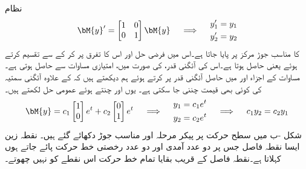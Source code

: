 نظام 
\begin{gather}\label{مساوات_نظام_مناسب_جوڑ}
\begin{aligned}
\bM{y}'=\begin{bmatrix} 1 & 0 \\ 0 &1 \end{bmatrix} \bM{y}
\end{aligned}\quad \implies \quad 
\begin{aligned} 
y_1'&=y_1\\
y_2'&=y_2
\end{aligned}
\end{gather}
کا مناسب جوڑ مرکز پر پایا جاتا ہے۔اس میں فرضی حل  اور اس کا تفرق  پر کر کے  سے تقسیم کرتے ہوئے   یعنی  حاصل ہوتا ہے۔اس کی آئگنی قدر،  کی صورت میں، امتیازی مساوات  سے    حاصل ہوتی ہے۔مساوات  کے اجزاء   اور  میں حاصل آئگنی قدر پر کرتے ہوئے ہم دیکھتے ہیں کہ  کے علاوہ آئگنی سمتیہ  کی کوئی بھی قیمت چننی جا سکتی ہے۔ یوں  اور  چنتے ہوئے عمومی حل لکھتے ہیں۔
\begin{gather*}
\begin{aligned}
\bM{y}=c_1\begin{bmatrix}1 \\ 0  \end{bmatrix} e^{t} +c_2\begin{bmatrix} 0 \\ 1 \end{bmatrix} e^{t}
\end{aligned}\quad \implies \quad
\begin{aligned}
y_1&=c_1e^t\\
y_2&=c_2e^t
\end{aligned} \quad \implies \quad
\begin{aligned}
c_1y_2=c_2y_1
\end{aligned}
\end{gather*} 
شکل -ب میں سطح حرکت پر پیکر مرحلہ اور مناسب جوڑ دکھائے گئے ہیں۔ 
\quad نقطہ زین\\
ایسا نقطہ فاصل  جس پر دو عدد آمدی اور دو عدد رخصتی خط حرکت پائے جاتے ہوں   کہلاتا ہے۔نقطہ فاصل کے قریب بقایا تمام خط حرکت اس نقطے کو نہیں چھوتے۔

